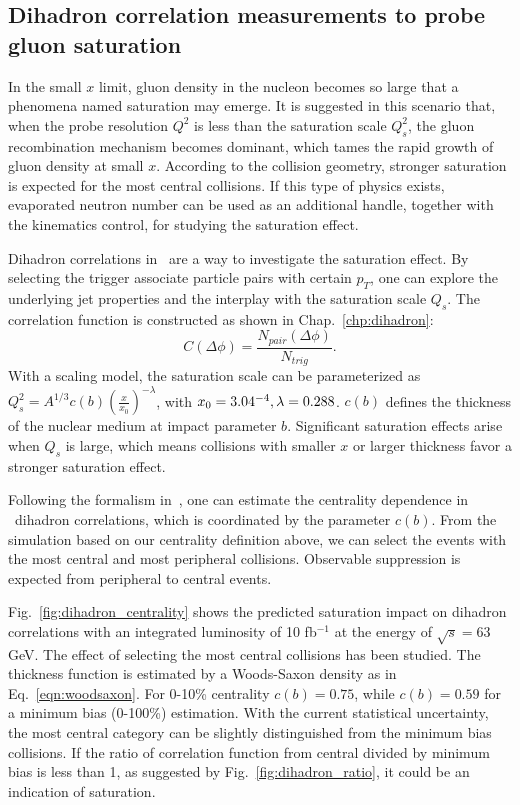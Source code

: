 \subsection{Dihadron correlation measurements to probe gluon saturation}

In the small $x$ limit, gluon density in the nucleon becomes so large that a
phenomena named saturation may emerge. It is suggested in this scenario that, when the probe
resolution $Q^{2}$ is less than the saturation scale $Q^{2}_{s}$, the gluon
recombination mechanism becomes dominant, which tames the rapid growth of
gluon density at small $x$. According to the collision
geometry, stronger saturation is expected for the most central collisions. If
this type of physics exists, evaporated neutron number can be used as an
additional handle, together with the kinematics control, for studying the saturation effect.

Dihadron correlations in \eA\ are a way to investigate the saturation effect. By
selecting the trigger associate particle pairs with certain $p_{T}$, one can
explore the underlying jet properties and the interplay with the saturation
scale $Q_{s}$. The correlation function is constructed as shown in Chap.~\ref{chp:dihadron}:
\begin{equation}
C(\Delta\phi)=\frac{N_{pair}(\Delta\phi)}{N_{trig}}.
\end{equation}
With a scaling model, the saturation scale can be parameterized as
$Q_{s}^{2}=A^{1/3} c(b)(\frac{x}{x_{0}})^{-\lambda}$, with $x_{0}=3.04\time
10^{-4}, \lambda = 0.288$. $c(b)$ defines the thickness of the nuclear medium at
impact parameter $b$. Significant saturation effects arise when $Q_{s}$ is
large, which means collisions with smaller $x$ or larger thickness favor a
stronger saturation effect.

Following the formalism in~\cite{Zheng:2014vka}, one can estimate the centrality
dependence in \eA\ dihadron correlations, which is coordinated by the parameter $c(b)$.
From the simulation based on our centrality definition above, we can select the
events with the most central and most peripheral collisions. Observable suppression
is expected from peripheral to central events.

Fig.~\ref{fig:dihadron_centrality} shows the predicted saturation impact on dihadron correlations with an integrated luminosity of 10 fb$^{-1}$ at the energy of $\sqrt{s}=63$ GeV.
The effect of selecting the most central collisions has been studied. The thickness function is estimated by
a Woods-Saxon density as in Eq.~\ref{eqn:woodsaxon}. For 0-10\% centrality $c(b)=0.75$, while $c(b)=0.59$
for a minimum bias (0-100\%) estimation. With the current statistical uncertainty, the most central category can be slightly distinguished from the minimum bias collisions. If the ratio of correlation function from central divided by minimum bias is less than 1, as suggested by Fig.~\ref{fig:dihadron_ratio}, it could be an indication of saturation.



